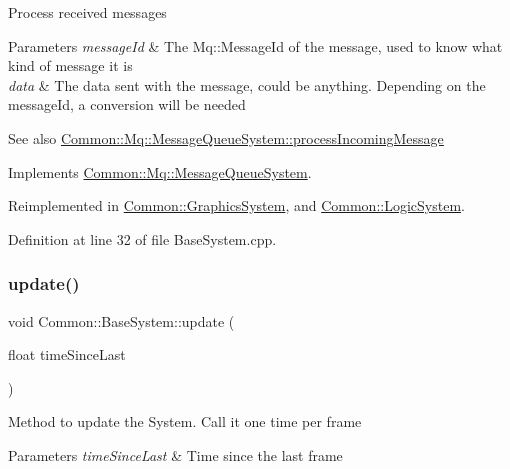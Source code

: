 Process received messages 
\begin{DoxyParams}{Parameters}
{\em message\+Id} & The Mq\+::\+Message\+Id of the message, used to know what kind of message it is \\
\hline
{\em data} & The data sent with the message, could be anything. Depending on the message\+Id, a conversion will be needed \\
\hline
\end{DoxyParams}
\begin{DoxySeeAlso}{See also}
\hyperlink{class_common_1_1_mq_1_1_message_queue_system_ad6eb849b72f03e3e4f09c6457c8ecda6}{Common\+::\+Mq\+::\+Message\+Queue\+System\+::process\+Incoming\+Message} 
\end{DoxySeeAlso}


Implements \hyperlink{class_common_1_1_mq_1_1_message_queue_system_ad6eb849b72f03e3e4f09c6457c8ecda6}{Common\+::\+Mq\+::\+Message\+Queue\+System}.



Reimplemented in \hyperlink{class_common_1_1_graphics_system_a8d286a151ed9a65f0eebe1ac119e2d59}{Common\+::\+Graphics\+System}, and \hyperlink{class_common_1_1_logic_system_a4495ecadf034103ad58deab6802543fa}{Common\+::\+Logic\+System}.



Definition at line 32 of file Base\+System.\+cpp.

\mbox{\label{class_common_1_1_base_system_af71a7156da8b0a4feab83ad72162a0c2}} 
\subsubsection{\texorpdfstring{update()}{update()}}
{\footnotesize\ttfamily void Common\+::\+Base\+System\+::update (\begin{DoxyParamCaption}\item[{float}]{time\+Since\+Last }\end{DoxyParamCaption})}

Method to update the System. Call it one time per frame 
\begin{DoxyParams}{Parameters}
{\em time\+Since\+Last} & Time since the last frame \\
\hline
\end{DoxyParams}


